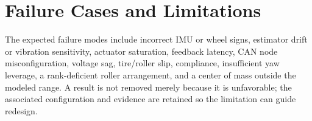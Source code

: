 \clearpage

\section{Failure Cases and Limitations}\label{failure-cases-and-limitations}

The expected failure modes include incorrect IMU or wheel signs,
estimator drift or vibration sensitivity, actuator saturation, feedback
latency, CAN node misconfiguration, voltage sag, tire\slash{}roller slip,
compliance, insufficient yaw leverage, a rank-deficient roller
arrangement, and a center of mass outside the modeled range. A result is
not removed merely because it is unfavorable; the associated
configuration and evidence are retained so the limitation can guide
redesign.

\clearpage
